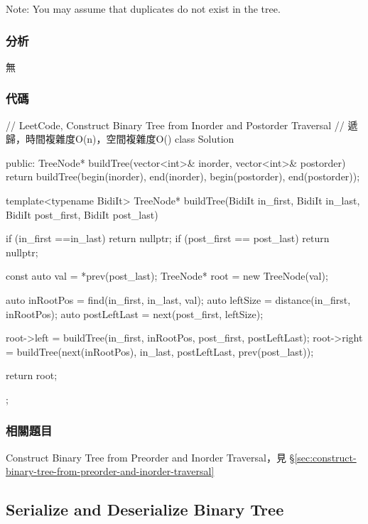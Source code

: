 Note:
You may assume that duplicates do not exist in the tree.


\subsubsection{分析}
無


\subsubsection{代碼}
\begin{Code}
// LeetCode, Construct Binary Tree from Inorder and Postorder Traversal
// 遞歸，時間複雜度O(n)，空間複雜度O(\logn)
class Solution {
public:
    TreeNode* buildTree(vector<int>& inorder, vector<int>& postorder) {
        return buildTree(begin(inorder), end(inorder),
                begin(postorder), end(postorder));
    }

    template<typename BidiIt>
    TreeNode* buildTree(BidiIt in_first, BidiIt in_last,
            BidiIt post_first, BidiIt post_last) {
        if (in_first ==in_last) return nullptr;
        if (post_first == post_last) return nullptr;

        const auto val = *prev(post_last);
        TreeNode* root = new TreeNode(val);

        auto inRootPos = find(in_first, in_last, val);
        auto leftSize = distance(in_first, inRootPos);
        auto postLeftLast = next(post_first, leftSize);

        root->left = buildTree(in_first, inRootPos, post_first, postLeftLast);
        root->right = buildTree(next(inRootPos), in_last, postLeftLast, prev(post_last));

        return root;
    }
};
\end{Code}


\subsubsection{相關題目}
\begindot
\item Construct Binary Tree from Preorder and Inorder Traversal，見 \S \ref{sec:construct-binary-tree-from-preorder-and-inorder-traversal}
\myenddot

\subsection{Serialize and Deserialize Binary Tree}
\label{sec:serialize-and-deserialize-binary-tree}



